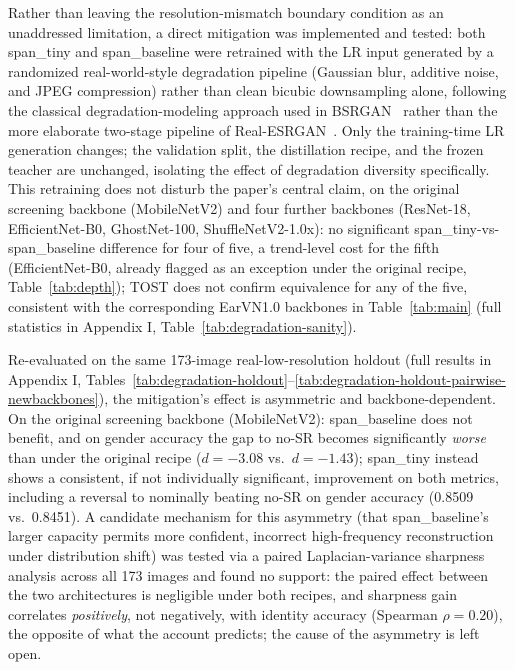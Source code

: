 \documentclass[pdflatex,sn-vancouver-num]{sn-jnl}
\begin{document}
Rather than leaving the resolution-mismatch boundary condition as an unaddressed limitation, a direct mitigation was implemented and tested: both span\_tiny and span\_baseline were retrained with the LR input generated by a randomized real-world-style degradation pipeline (Gaussian blur, additive noise, and JPEG compression) rather than clean bicubic downsampling alone, following the classical degradation-modeling approach used in BSRGAN~\cite{zhang2021designing} rather than the more elaborate two-stage pipeline of Real-ESRGAN~\cite{wang2021realesrgan}. Only the training-time LR generation changes; the validation split, the distillation recipe, and the frozen teacher are unchanged, isolating the effect of degradation diversity specifically. This retraining does not disturb the paper's central claim, on the original screening backbone (MobileNetV2) and four further backbones (ResNet-18, EfficientNet-B0, GhostNet-100, ShuffleNetV2-1.0x): no significant span\_tiny-vs-span\_baseline difference for four of five, a trend-level cost for the fifth (EfficientNet-B0, already flagged as an exception under the original recipe, Table~\ref{tab:depth}); TOST does not confirm equivalence for any of the five, consistent with the corresponding EarVN1.0 backbones in Table~\ref{tab:main} (full statistics in Appendix I, Table~\ref{tab:degradation-sanity}).

Re-evaluated on the same 173-image real-low-resolution holdout (full results in Appendix I, Tables~\ref{tab:degradation-holdout}--\ref{tab:degradation-holdout-pairwise-newbackbones}), the mitigation's effect is asymmetric and backbone-dependent. On the original screening backbone (MobileNetV2): span\_baseline does not benefit, and on gender accuracy the gap to no-SR becomes significantly \emph{worse} than under the original recipe ($d{=}{-}3.08$ vs.\ $d{=}{-}1.43$); span\_tiny instead shows a consistent, if not individually significant, improvement on both metrics, including a reversal to nominally beating no-SR on gender accuracy (0.8509 vs.\ 0.8451). A candidate mechanism for this asymmetry (that span\_baseline's larger capacity permits more confident, incorrect high-frequency reconstruction under distribution shift) was tested via a paired Laplacian-variance sharpness analysis across all 173 images and found no support: the paired effect between the two architectures is negligible under both recipes, and sharpness gain correlates \emph{positively}, not negatively, with identity accuracy (Spearman $\rho{=}0.20$), the opposite of what the account predicts; the cause of the asymmetry is left open.
\end{document}
